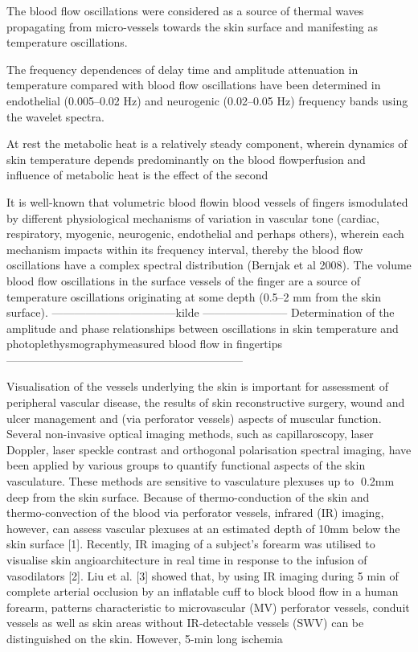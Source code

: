 The blood flow oscillations were
considered as a source of thermal waves propagating from micro-vessels
towards the skin surface and manifesting as temperature oscillations.

The frequency dependences of delay time and amplitude attenuation in
temperature compared with blood flow oscillations have been determined
in endothelial (0.005–0.02 Hz) and neurogenic (0.02–0.05 Hz) frequency
bands using the wavelet spectra.

At rest
the metabolic heat is a relatively steady component, wherein dynamics of skin temperature
depends predominantly on the blood flowperfusion and influence of metabolic heat is the effect
of the second

It is well-known that volumetric blood flowin blood vessels of fingers ismodulated by different
physiological mechanisms of variation in vascular tone (cardiac, respiratory, myogenic,
neurogenic, endothelial and perhaps others), wherein each mechanism impacts within its
frequency interval, thereby the blood flow oscillations have a complex spectral distribution
(Bernjak et al 2008). The volume blood flow oscillations in the surface vessels of the finger
are a source of temperature oscillations originating at some depth (0.5–2 mm from the skin
surface).
---------------------------------kilde -----------------------
Determination of the amplitude and phase
relationships between oscillations in skin
temperature and photoplethysmographymeasured
blood flow in fingertips
---------------------------------------------------------------



Visualisation of the vessels underlying the skin is important for assessment of peripheral vascular
disease, the results of skin reconstructive surgery, wound and ulcer management and
(via perforator vessels) aspects of muscular function. Several non-invasive optical imaging
methods, such as capillaroscopy, laser Doppler, laser speckle contrast and orthogonal polarisation
spectral imaging, have been applied by various groups to quantify functional aspects of
the skin vasculature. These methods are sensitive to vasculature plexuses up to 0.2mm deep
from the skin surface. Because of thermo-conduction of the skin and thermo-convection of
the blood via perforator vessels, infrared (IR) imaging, however, can assess vascular plexuses
at an estimated depth of 10mm below the skin surface [1]. Recently, IR imaging of a subject’s
forearm was utilised to visualise skin angioarchitecture in real time in response to the
infusion of vasodilators [2].
Liu et al. [3] showed that, by using IR imaging during 5 min of complete arterial
occlusion by an inflatable cuff to block blood flow in a human forearm, patterns characteristic
to microvascular (MV) perforator vessels, conduit vessels as well as skin areas without
IR-detectable vessels (SWV) can be distinguished on the skin. However, 5-min long ischemia

